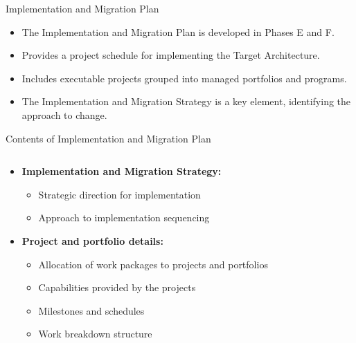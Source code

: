 \documentclass[aspectratio=169, table]{beamer}
\begin{document}
\begin{frame}{Implementation and Migration Plan}
	\begin{itemize}
		\item The Implementation and Migration Plan is developed in Phases E and F.
		\item Provides a project schedule for implementing the Target Architecture.
		\item Includes executable projects grouped into managed portfolios and programs.
		\item The Implementation and Migration Strategy is a key element, identifying the approach to change.
	\end{itemize}
\end{frame}

\begin{frame}{\LARGE{Contents of Implementation and Migration Plan}}
	\vspace{15pt}
	\begin{columns}[T] %
		\begin{column}{0.48\textwidth}
			\begin{itemize}
				\item \textbf{Implementation and Migration Strategy:}
				\begin{itemize}
					\item Strategic direction for implementation
					\item Approach to implementation sequencing
				\end{itemize}
				\item \textbf{Project and portfolio details:}
				\begin{itemize}
					\item Allocation of work packages to projects and portfolios
					\item Capabilities provided by the projects
					\item Milestones and schedules
					\item Work breakdown structure
				\end{itemize}
			\end{itemize}
		\end{column}
		

\end{columns}
\end{frame}
\end{document}
